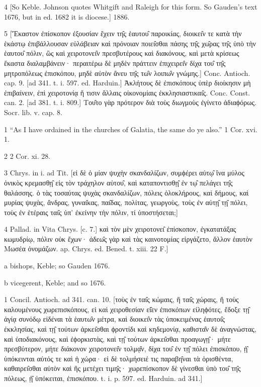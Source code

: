 4
[So Keble. Johnson quotes Whitgift and Raleigh for this form. So Gauden’s text 1676, but in ed. 1682 it is diocese.] 1886.

5
[Ἕκαστον ἐπίσκοπον ἐξουσίαν ἔχειν τη̑ς ἑαυτου̑ παροικίας, διοικει̑ν τε κατὰ τὴν ἑκάστῳ ἐπιβάλλουσαν εὐλάβειαν καὶ πρόνοιαν ποιει̑σθαι πάσης τη̑ς χω̑ρας τη̑ς ὑπὸ τὴν ἑαυτου̑ πόλιν, ὣς καὶ χειροτονει̑ν πρεσβυτέρους καὶ διακόνους, καὶ μετὰ κρίσεως ἕκαστα διαλαμβάνειν· περαιτέρω δὲ μηδὲν πράττειν ἐπιχειρει̑ν δίχα του̑ τη̑ς μητροπόλεως ἐπισκόπου, μηδὲ αὐτὸν ἄνευ τη̑ς τω̑ν λοιπω̑ν γνώμης.] Conc. Antioch. cap. 9. [ad 341. t. i. 597. ed. Harduin.] Ἀκλήτους δὲ ἐπισκόπους ὑπὲρ διοίκησιν μὴ ἐπιβαίνειν, ἐπὶ χειροτονίᾳ ἤ τισιν ἄλλαις οἰκονομίαις ἐκκλησιαστικαι̑ς. Conc. Const. can. 2. [ad 381. t. i. 809.] Του̑το γὰρ πρότερον διὰ τοὺς διωγμοὺς ἐγίνετο ἀδιαϕόρως. Socr. lib. v. cap. 8.

1
“As I have ordained in the churches of Galatia, the same do ye also.” 1 Cor. xvi. 1.

2
2 Cor. xi. 28.

3
Chrys. in i. ad Tit. [εἰ δὲ ὁ μίαν ψυχὴν σκανδαλίζων, συμϕέρει αὐτῳ̑ ἵνα μύλος ὀνικὸς κρεμασθῃ̑ εἰς τὸν τράχηλον αὐτου̑, καὶ καταποντισθῃ̑ ἐν τῳ̑ πελάγει τη̑ς θαλάσσης. ὁ τὰς τοσαύτας ψυχὰς σκανδαλίζων, πόλεις ὁλοκλήρους, καὶ δήμους, καὶ μυρίας ψυχὰς, ἄνδρας, γυναι̑κας, παι̑δας, πολίτας, γεωργοὺς, τοὺς ἐν αὐτῃ̑ τῃ̑ πόλει, τοὺς ἐν ἑτέραις ται̑ς ὑπ’ ἐκείνην τὴν πόλιν, τί ὑποστήσεται;]

4
Pallad. in Vita Chrys. [c. 7.] καὶ τὸν μὲν χειροτονει̑ ἐπίσκοπον, ἐγκατατάξας κωμυδρίῳ, πόλιν οὐκ ἔχων· ἀδεω̑ς γὰρ καὶ τὰς καινοτομίας εἰργάζετο, ἄλλον ἑαυτὸν Μωσέα ὀνομάζων. ap. Chrys. ed. Bened. t. xiii. 22 F.]

a
bishops, Keble; so Gauden 1676.

b
vicegerent, Keble; and so 1676.

1
Concil. Antioch. ad 341. can. 10. [τοὺς ἐν ται̑ς κώμαις, ἢ ται̑ς χώραις, ἢ τοὺς καλουμένους χωρεπισκόπους, εἰ καὶ χειροθεσίαν εἰ̑εν ἐπισκόπων εἰληϕότες, ἔδοξε τῃ̑ ἁγίᾳ συνόδῳ εἰδέναι τὰ ἑαυτω̑ν μέτρα, καὶ διοικει̑ν τὰς ὑποκειμένας ἑαυτοι̑ς ἐκκλησίας, καὶ τῃ̑ τούτων ἀρκει̑σθαι ϕροντίδι καὶ κηδεμονίᾳ, καθιστα̑ν δὲ ἀναγνώστας, καὶ ὑποδιακόνους, καὶ ἐϕορκιστὰς, καὶ τῃ̑ τούτων ἀρκει̑σθαι προαγωγῃ̑· μήτε πρεσβύτερον, μήτε διάκονον χειροτονει̑ν τολμᾳ̑ν, δίχα του̑ ἐν τῃ̑ πόλει ἐπισκόπου, ᾑ̑ ὑπόκεινται αὐτός τε καὶ ἡ χώρα· εἰ δὲ τολμήσειέ τις παραβη̑ναι τὰ ὁρισθέντα, καθαιρει̑σθαι αὐτὸν καὶ ἣς μετέχει τιμη̑ς· χωρεπίσκοπον δὲ γίνεσθαι ὑπὸ του̑ τη̑ς πόλεως, ᾑ̑ ὑπόκειται, ἐπισκόπου. t. i. p. 597. ed. Harduin. ad 341.]

